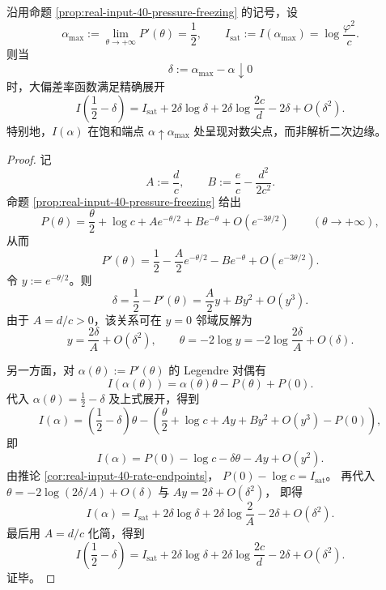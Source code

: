 \begin{theorem}[饱和端点大偏差率函数的对数尖点]\label{thm:killo-real-input-40-rate-logarithmic-cusp}
沿用命题 \ref{prop:real-input-40-pressure-freezing} 的记号，设
\[
\alpha_{\max}:=\lim_{\theta\to+\infty}P'(\theta)=\frac12,
\qquad
I_{\mathrm{sat}}:=I(\alpha_{\max})=\log\frac{\varphi^2}{c}.
\]
则当
\[
\delta:=\alpha_{\max}-\alpha\downarrow 0
\]
时，大偏差率函数满足精确展开
\[
I\!\left(\frac12-\delta\right)
=
I_{\mathrm{sat}}
+2\delta\log\delta
+2\delta\log\frac{2c}{d}
-2\delta
+O(\delta^2).
\]
特别地，\(I(\alpha)\) 在饱和端点 \(\alpha\uparrow \alpha_{\max}\) 处呈现对数尖点，而非解析二次边缘。
\end{theorem}
\begin{proof}
记
\[
A:=\frac{d}{c},
\qquad
B:=\frac{e}{c}-\frac{d^2}{2c^2}.
\]
命题 \ref{prop:real-input-40-pressure-freezing} 给出
\[
P(\theta)
=
\frac{\theta}{2}+\log c
+Ae^{-\theta/2}
+Be^{-\theta}
+O(e^{-3\theta/2})
\qquad (\theta\to+\infty),
\]
从而
\[
P'(\theta)
=
\frac12-\frac{A}{2}e^{-\theta/2}-Be^{-\theta}+O(e^{-3\theta/2}).
\]
令 \(y:=e^{-\theta/2}\)。则
\[
\delta
=
\frac12-P'(\theta)
=
\frac{A}{2}y+By^2+O(y^3).
\]
由于 \(A=d/c>0\)，该关系可在 \(y=0\) 邻域反解为
\[
y=\frac{2\delta}{A}+O(\delta^2),
\qquad
\theta=-2\log y=-2\log\frac{2\delta}{A}+O(\delta).
\]

另一方面，对 \(\alpha(\theta):=P'(\theta)\) 的 Legendre 对偶有
\[
I(\alpha(\theta))
=
\alpha(\theta)\theta-P(\theta)+P(0).
\]
代入 \(\alpha(\theta)=\frac12-\delta\) 及上式展开，得到
\[
I(\alpha)
=
\left(\frac12-\delta\right)\theta
-\left(
\frac{\theta}{2}+\log c+Ay+By^2+O(y^3)-P(0)
\right),
\]
即
\[
I(\alpha)
=
P(0)-\log c-\delta\theta-Ay+O(y^2).
\]
由推论 \ref{cor:real-input-40-rate-endpoints}，
\(
P(0)-\log c=I_{\mathrm{sat}}
\)。
再代入
\(
\theta=-2\log(2\delta/A)+O(\delta)
\)
与
\(
Ay=2\delta+O(\delta^2)
\)，
即得
\[
I(\alpha)
=
I_{\mathrm{sat}}
+2\delta\log\delta
+2\delta\log\frac{2}{A}
-2\delta
+O(\delta^2).
\]
最后用 \(A=d/c\) 化简，得到
\[
I\!\left(\frac12-\delta\right)
=
I_{\mathrm{sat}}
+2\delta\log\delta
+2\delta\log\frac{2c}{d}
-2\delta
+O(\delta^2).
\]
证毕。
\end{proof}

